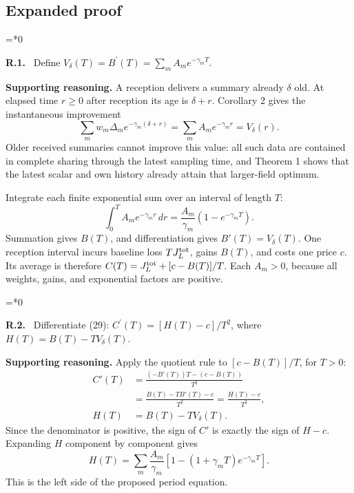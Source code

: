 \documentclass[12pt,letterpaper]{article}
\newenvironment{proofstep}[2]{%
  \begin{list}{}{\leftmargin=\dimexpr 0.17in*#2\relax%
  \setlength{\rightmargin}{0pt}\setlength{\topsep}{5pt}\setlength{\parsep}{2pt}}%
  \item[]\textbf{\textcolor{ink}{#1.}}\ }{\end{list}}
\begin{document}
\subsection*{Expanded proof}

\begin{proofstep}{R.1}{0}
\label{step:R.1}
Define $V_\delta(T)=B^{\prime}(T)=\sum_m A_m e^{-\gamma_mT}$.

\textbf{Supporting reasoning.}
A reception delivers a summary already $\delta$ old. At elapsed time $r\ge0$ after reception its age is $\delta+r$. Corollary 2 gives the instantaneous improvement
\[
\sum_m w_m\Delta_m e^{-\gamma_m(\delta+r)}
=\sum_m A_m e^{-\gamma_mr}=V_\delta(r).
\]
Older received summaries cannot improve this value: all such data are contained in complete sharing through the latest sampling time, and Theorem 1 shows that the latest scalar and own history already attain that larger-field optimum.

Integrate each finite exponential sum over an interval of length $T$:
\[
\int_0^T A_m e^{-\gamma_mr}\,dr
=\frac{A_m}{\gamma_m}(1-e^{-\gamma_mT}).
\]
Summation gives $B(T)$, and differentiation gives $B'(T)=V_\delta(T)$. One reception interval incurs baseline loss $TJ_L^{\rm tot}$, gains $B(T)$, and costs one price $c$. Its average is therefore $C(T)=J_L^{\rm tot}+[c-B(T)]/T$. Each $A_m>0$, because all weights, gains, and exponential factors are positive.
\par{}
\end{proofstep}

\begin{proofstep}{R.2}{0}
\label{step:R.2}
Differentiate (29): $C^{\prime}(T)=[H(T)-c]/T^2$, where $H(T)=B(T)-TV_\delta(T)$.

\textbf{Supporting reasoning.}
Apply the quotient rule to $[c-B(T)]/T$, for $T>0$:
\begin{align*}
C'(T)&=\frac{(-B'(T))T-(c-B(T))}{T^2}\\
&=\frac{B(T)-TB'(T)-c}{T^2}
=\frac{H(T)-c}{T^2},\\
H(T)&=B(T)-TV_\delta(T).
\end{align*}
Since the denominator is positive, the sign of $C'$ is exactly the sign of $H-c$. Expanding $H$ component by component gives
\[
H(T)=\sum_m\frac{A_m}{\gamma_m}
[1-(1+\gamma_mT)e^{-\gamma_mT}].
\]
This is the left side of the proposed period equation.
\par{}
\end{proofstep}
\end{document}
